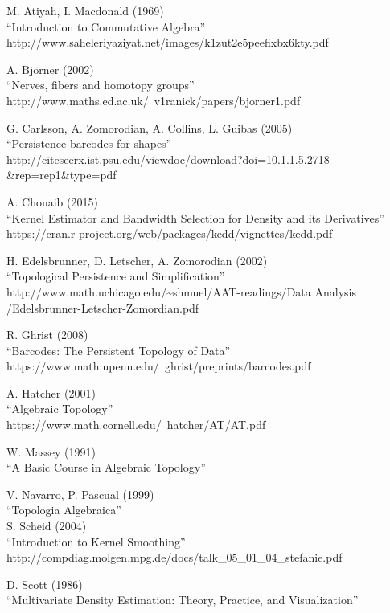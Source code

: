 \documentclass[12pt,a4paper,twoside]{article} %
\theoremstyle{plain}
\theoremstyle{definition}
\newcommand*\NewPage{\newpage\null\thispagestyle{empty}\newpage}
\begin{document}
\newpage
\begin{thebibliography}{99}
M. Atiyah, I. Macdonald (1969) \\
``Introduction to Commutative Algebra'' \\
http://www.saheleriyaziyat.net/images/k1zut2e5peefixbx6kty.pdf

A. Björner (2002) \\
``Nerves, fibers and homotopy groups'' \\
http://www.maths.ed.ac.uk/~v1ranick/papers/bjorner1.pdf

G. Carlsson, A. Zomorodian, A. Collins, L. Guibas (2005) \\
``Persistence barcodes for shapes'' \\
http://citeseerx.ist.psu.edu/viewdoc/download?doi=10.1.1.5.2718 \\
\&rep=rep1\&type=pdf

A. Chouaib (2015) \\
\small
``Kernel Estimator and Bandwidth Selection for Density and its Derivatives'' \\
\normalsize
https://cran.r-project.org/web/packages/kedd/vignettes/kedd.pdf

H. Edelsbrunner, D. Letscher, A. Zomorodian (2002) \\
``Topological Persistence and Simplification'' \\
http://www.math.uchicago.edu/\textasciitilde shmuel/AAT-readings/Data Analysis /Edelsbrunner-Letscher-Zomordian.pdf

R. Ghrist (2008)\\
``Barcodes: The Persistent Topology of Data'' \\
https://www.math.upenn.edu/~ghrist/preprints/barcodes.pdf

A. Hatcher (2001) \\
``Algebraic Topology'' \\
https://www.math.cornell.edu/~hatcher/AT/AT.pdf

W. Massey (1991) \\
``A Basic Course in Algebraic Topology''

V. Navarro, P. Pascual (1999) \\
``Topologia Algebraica'' \\

S. Scheid (2004) \\
``Introduction to Kernel Smoothing'' \\
http://compdiag.molgen.mpg.de/docs/talk\_05\_01\_04\_stefanie.pdf

D. Scott (1986) \\
\small
``Multivariate Density Estimation: Theory, Practice, and Visualization''
\normalsize

\end{thebibliography}

\NewPage
\end{document}
